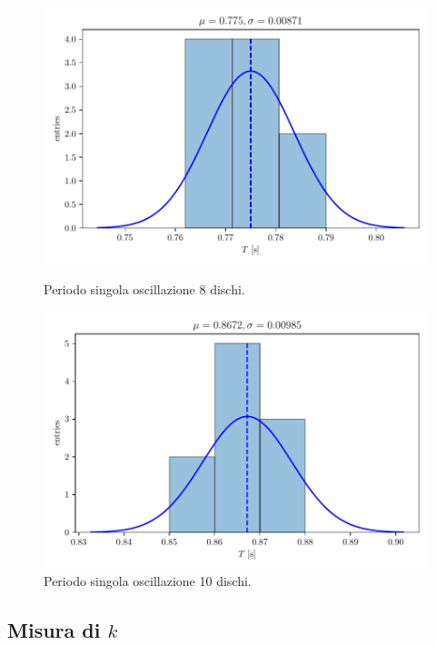 \documentclass[titlepage]{article}
\numberwithin{equation}{section}
\numberwithin{figure}{section}
\numberwithin{table}{section}
\begin{document}
\begin{figure}[ht]
  \centering
  \begin{minipage}{0.5 \textwidth}
    \includegraphics[width=\textwidth]{Images/Histo_T8.pdf}
    \caption{Periodo singola oscillazione 8 dischi.}
  \end{minipage}%
  \begin{minipage}{0.5 \textwidth}
    \includegraphics[width=\textwidth]{Images/Histo_T10.pdf}
    \caption{Periodo singola oscillazione 10 dischi.}
  \end{minipage}
\end{figure}

\subsection{Misura di \texorpdfstring{$k$}{k}}
\end{document}
